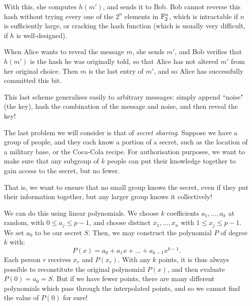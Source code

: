 \documentclass{article}
\begin{document}
With this, she computes $h(m')$, and sends it to Bob. Bob cannot reverse this hash without trying every one of the $2^n$ elements in $\mathbb{F}_2^n$, which is intractable if $n$ is sufficiently large, or cracking the hash function (which is usually very difficult, if $h$ is well-designed).

When Alice wants to reveal the message $m$, she sends $m'$, and Bob verifies that $h(m')$ is the hash he was originally told, so that Alice has not altered $m'$ from her original choice. Then $m$ is the last entry of $m'$, and so Alice has successfully committed this bit.

\begin{note}
	This last scheme generalises easily to arbitrary messages: simply append ``noise" (the key), hash the combination of the message and noise, and then reveal the key!
\end{note}

The last problem we will consider is that of \textit{secret sharing}. Suppose we have a group of people, and they each know a portion of a secret, such as the location of a military base, or the Coca-Cola recipe. For authorisation purposes, we want to make sure that any subgroup of $k$ people can put their knowledge together to gain access to the secret, but no fewer.

That is, we want to ensure that no small group knows the secret, even if they put their information together, but any larger group knows it collectively!

We can do this using linear polynomials. We choose $k$ coefficients $a_1, \dots, a_k$ at random, with $0 \leq a_j \leq p-1$, and choose distinct $x_1, \dots, x_n$ with $1 \leq x_j \leq p-1$. We set $a_0$ to be our secret $S$. Then, we may construct the polynomial $P$ of degree $k$ with:
\[
P(x) = a_0 + a_1 x + \dots + a_{k-1} x^{k-1}.
\]
Each person $r$ receives $x_r$ and $P(x_r)$. With any $k$ points, it is thus always possible to reconstitute the original polynomial $P(x)$, and then evaluate $P(0) = a_0 = S$. But if we have fewer points, there are many different polynomials which pass through the interpolated points, and so we cannot find the value of $P(0)$ for sure!
\end{document}
